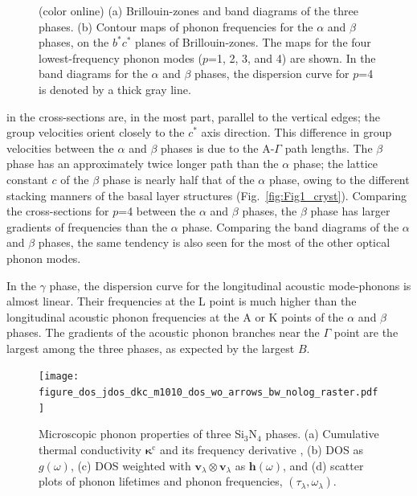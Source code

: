 \documentclass[twocolumn,amsmath,amssymb,a4paper,prb,superscriptaddress,floatfix]{revtex4-1}
\begin{document}
\begin{figure}[H]
\begin{center}
                   \caption{(color online) (a) Brillouin-zones and  band diagrams of the three phases. (b) Contour maps
                           of phonon frequencies for the $\alpha$ and $\beta$ phases, on the  $b^*c^*$  planes of Brillouin-zones.
                           The maps for the four lowest-frequency phonon modes ($p$=1, 2, 3,
                           and 4) are shown. In the band diagrams for the $\alpha$ and
                           $\beta$ phases, the dispersion curve for $p$=4 is denoted by a thick gray line.
                   \label{fig:Fig4_ver5_338} }
    \end{center}
\end{figure}
\noindent
in the cross-sections are, in the
most part, parallel to the vertical edges; the group velocities orient closely
to the $c^*$ axis direction.
This difference in group velocities between the $\alpha$ and $\beta$ phases is due to the A-$\Gamma$
path lengths. The $\beta$ phase has an approximately twice longer path than the
$\alpha$ phase; the lattice constant $c$ of the $\beta$ phase is nearly half
that of the $\alpha$ phase, owing to the different stacking manners of the basal
layer structures (Fig.~\ref{fig:Fig1_cryst}).  Comparing the cross-sections for
$p$=4 between the $\alpha$ and $\beta$ phases, the $\beta$
phase has larger gradients of frequencies than the $\alpha$ phase.  Comparing the
band diagrams of the $\alpha$ and $\beta$ phases, the same tendency is also seen
for the most of the other optical phonon modes.

In the $\gamma$ phase, the dispersion curve for the longitudinal acoustic
mode-phonons is almost linear. Their frequencies at the L point is much higher than the
longitudinal acoustic phonon frequencies at the A or K points of the $\alpha$
and $\beta$ phases.  The gradients of the acoustic phonon branches near the
$\Gamma$ point are the largest among the three phases, as expected by the
largest $B$.

\onecolumngrid


\begin{figure}[h]
         \texttt{[image: figure\_dos\_jdos\_dkc\_m1010\_dos\_wo\_arrows\_bw\_nolog\_raster.pdf]}
  \caption{Microscopic phonon properties of three Si$_3$N$_4$
          phases. (a) Cumulative thermal conductivity $\boldsymbol{\kappa}^\text{c}$ and
          its frequency derivative
          , (b) DOS as $g(\omega)$, (c) DOS weighted with $\mathbf{v}_\lambda \otimes
          \mathbf{v}_\lambda$ as $\boldsymbol{h}(\omega)$, and (d) scatter plots of phonon
          lifetimes and phonon frequencies, $(\tau_\lambda,\omega_\lambda)$.
  \label{fig:Fig5_338_rev} }
\end{figure}
\twocolumngrid
\end{document}
